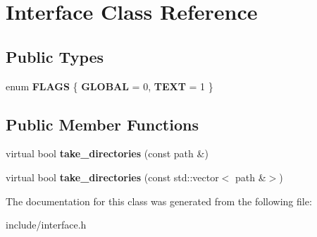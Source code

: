 \hypertarget{class_interface}{}\section{Interface Class Reference}
\label{class_interface}
\subsection*{Public Types}
\begin{DoxyCompactItemize}
\item 
\mbox{\label{class_interface_a30f9918f0087b9854d68be4eb2eee487}} 
enum {\bfseries F\+L\+A\+GS} \{ {\bfseries G\+L\+O\+B\+AL} = 0, 
{\bfseries T\+E\+XT} = 1
 \}
\end{DoxyCompactItemize}
\subsection*{Public Member Functions}
\begin{DoxyCompactItemize}
\item 
\mbox{\label{class_interface_add0beb0b012e64d5bb6f94cecb1b01d8}} 
virtual bool {\bfseries take\+\_\+directories} (const path \&)
\item 
\mbox{\label{class_interface_a1049e20fb137ea850b2a3568c82b36e1}} 
virtual bool {\bfseries take\+\_\+directories} (const std\+::vector$<$ path \&$>$)
\end{DoxyCompactItemize}


The documentation for this class was generated from the following file\+:\begin{DoxyCompactItemize}
\item 
include/interface.\+h\end{DoxyCompactItemize}
